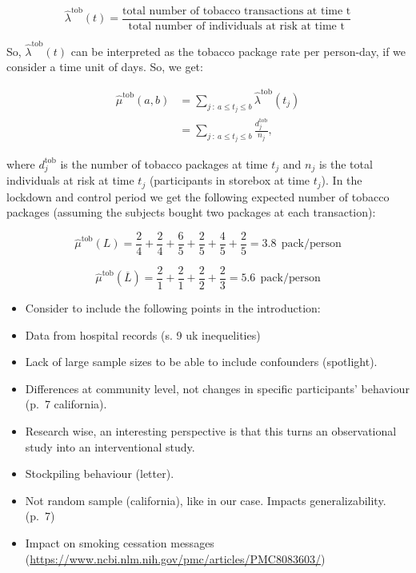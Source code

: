 \documentclass[
  11pt,
]{article}
\providecommand{\tightlist}{%
  \setlength{\itemsep}{0pt}\setlength{\parskip}{0pt}}
\begin{document}
\[
\hat{\lambda}^{\text{tob}}(t)=\frac{\text{total number of tobacco transactions at time t}}{\text{total number of individuals at risk at time t}}
\]

So, \(\hat{\lambda}^{\text{tob}}(t)\) can be interpreted as the tobacco
package rate per person-day, if we consider a time unit of days. So, we
get:

\begin{align*}
\hat{\mu}^{\text{tob}}(a, b) &= \sum_{j \ : \ a \leq t_j \leq b} \hat{\lambda}^{\text{tob}}(t_j) \\
&=\sum_{j \ : \ a \leq t_j \leq b} \frac{d^{\text{tob}}_j}{n_j},
\end{align*}

where \(d^{\text{tob}}_j\) is the number of tobacco packages at time
\(t_j\) and \(n_j\) is the total individuals at risk at time \(t_j\)
(participants in storebox at time \(t_j\)). \newline In the lockdown and
control period we get the following expected number of tobacco packages
(assuming the subjects bought two packages at each transaction):

\[
\hat{\mu}^{\text{tob}}(L)= \frac{2}{4}+\frac{2}{4}+\frac{6}{5}+\frac{2}{5}+\frac{4}{5}+\frac{2}{5}=3.8 \ \ \text{pack/person}
\]

\[
\hat{\mu}^{\text{tob}}(\overline{L})= \frac{2}{1}+\frac{2}{1}+\frac{2}{2}+\frac{2}{3}=5.6 \ \ \text{pack/person}
\]

\newpage

\begin{itemize}
\tightlist
\item
  Consider to include the following points in the introduction:
\item
  Data from hospital records (s. 9 uk inequelities)
\item
  Lack of large sample sizes to be able to include confounders
  (spotlight).
\item
  Differences at community level, not changes in specific participants'
  behaviour (p.~7 california).
\item
  Research wise, an interesting perspective is that this turns an
  observational study into an interventional study.
\item
  Stockpiling behaviour (letter).
\item
  Not random sample (california), like in our case. Impacts
  generalizability. (p.~7)
\item
  Impact on smoking cessation messages
  (\url{https://www.ncbi.nlm.nih.gov/pmc/articles/PMC8083603/})
\end{itemize}
\end{document}
